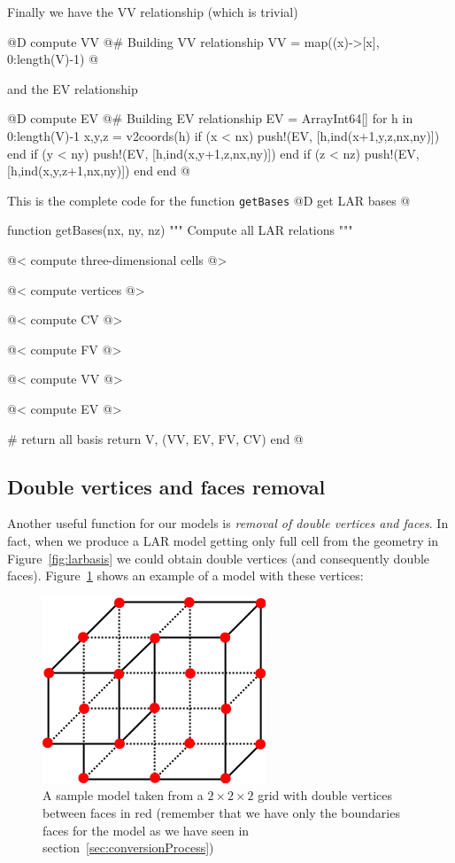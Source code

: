 \documentclass[11pt,oneside]{article}	%
\begin{document}
Finally we have the VV relationship (which is trivial)

@D compute VV
@{# Building VV relationship
VV = map((x)->[x], 0:length(V)-1) @}

and the EV relationship

@D compute EV
@{# Building EV relationship
EV = Array{Int64}[]
for h in 0:length(V)-1
  x,y,z = v2coords(h)
  if (x < nx)
    push!(EV, [h,ind(x+1,y,z,nx,ny)])
  end
  if (y < ny)
    push!(EV, [h,ind(x,y+1,z,nx,ny)])
  end
  if (z < nz)
    push!(EV, [h,ind(x,y,z+1,nx,ny)])
  end
end @}

This is the complete code for the function \texttt{getBases}
@D get LAR bases
@{function getBases(nx, ny, nz)
  """
  Compute all LAR relations
  """

  @< compute three-dimensional cells @>

  @< compute vertices @>

  @< compute CV @>

  @< compute FV @>
  
  @< compute VV @>
  
  @< compute EV @>

  # return all basis
  return V, (VV, EV, FV, CV)
end @}

\subsection{Double vertices and faces removal}\label{sec:doubleverticesandfacesremoval}

Another useful function for our models is \textit{removal of double vertices and faces}. In fact, when we produce a LAR model getting only full cell from the geometry in Figure~\ref{fig:larbasis} we could obtain double vertices (and consequently double faces). Figure~\ref{fig:duplicates} shows an example of a model with these vertices:

\begin{figure}[htb] %
   \centering
   \includegraphics[width=0.25\linewidth]{images/duplicates.png}
   \caption{A sample model taken from a $2 \times 2 \times 2$ grid with double vertices between faces in red (remember that we have only the boundaries faces for the model as we have seen in section~\ref{sec:conversionProcess})}
   \label{fig:duplicates}
\end{figure}
\end{document}
